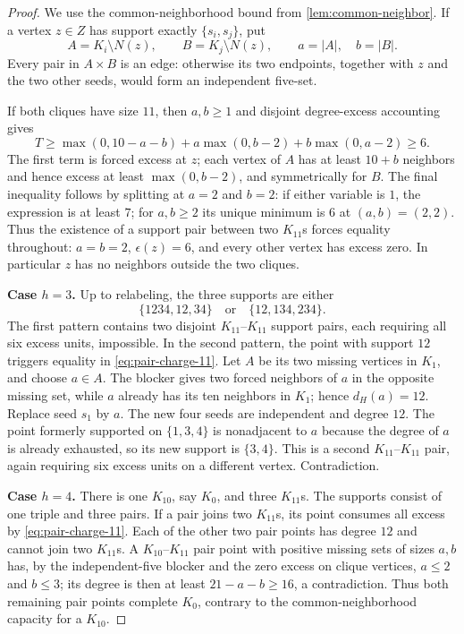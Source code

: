 \begin{proof}
We use the common-neighborhood bound from \cref{lem:common-neighbor}. If a vertex $z\in Z$ has support exactly $\{s_i,s_j\}$, put
\[
A=K_i\setminus N(z),\qquad B=K_j\setminus N(z),
\qquad a=|A|,\quad b=|B|.
\]
Every pair in $A\times B$ is an edge: otherwise its two endpoints, together with $z$ and the two other seeds, would form an independent five-set.

If both cliques have size $11$, then $a,b\geq1$ and disjoint degree-excess accounting gives
\begin{equation}
T\geq
\max(0,10-a-b)+a\max(0,b-2)+b\max(0,a-2)\geq6.
\label{eq:pair-charge-11}
\end{equation}
The first term is forced excess at $z$; each vertex of $A$ has at least $10+b$ neighbors and hence excess at least $\max(0,b-2)$, and symmetrically for $B$. The final inequality follows by splitting at $a=2$ and $b=2$: if either variable is $1$, the expression is at least $7$; for $a,b\geq2$ its unique minimum is $6$ at $(a,b)=(2,2)$. Thus the existence of a support pair between two $K_{11}$s forces equality throughout: $a=b=2$, $\epsilon(z)=6$, and every other vertex has excess zero. In particular $z$ has no neighbors outside the two cliques.

\medskip
\noindent\textbf{Case $h=3$.}
Up to relabeling, the three supports are either
\[
\{1234,12,34\}\quad\text{or}\quad\{12,134,234\}.
\]
The first pattern contains two disjoint $K_{11}$--$K_{11}$ support pairs, each requiring all six excess units, impossible. In the second pattern, the point with support $12$ triggers equality in \eqref{eq:pair-charge-11}. Let $A$ be its two missing vertices in $K_1$, and choose $a\in A$. The blocker gives two forced neighbors of $a$ in the opposite missing set, while $a$ already has its ten neighbors in $K_1$; hence $d_H(a)=12$. Replace seed $s_1$ by $a$. The new four seeds are independent and degree $12$. The point formerly supported on $\{1,3,4\}$ is nonadjacent to $a$ because the degree of $a$ is already exhausted, so its new support is $\{3,4\}$. This is a second $K_{11}$--$K_{11}$ pair, again requiring six excess units on a different vertex. Contradiction.

\medskip
\noindent\textbf{Case $h=4$.}
There is one $K_{10}$, say $K_0$, and three $K_{11}$s. The supports consist of one triple and three pairs. If a pair joins two $K_{11}$s, its point consumes all excess by \eqref{eq:pair-charge-11}. Each of the other two pair points has degree $12$ and cannot join two $K_{11}$s. A $K_{10}$--$K_{11}$ pair point with positive missing sets of sizes $a,b$ has, by the independent-five blocker and the zero excess on clique vertices, $a\leq2$ and $b\leq3$; its degree is then at least $21-a-b\geq16$, a contradiction. Thus both remaining pair points complete $K_0$, contrary to the common-neighborhood capacity for a $K_{10}$.


\end{proof}
